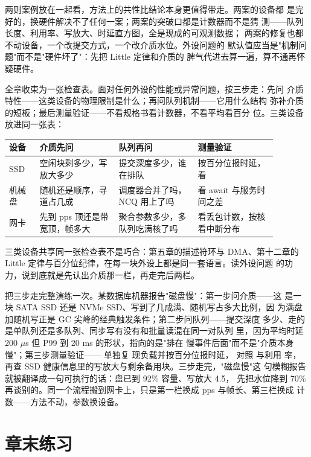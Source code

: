 两则案例放在一起看，方法上的共性比结论本身更值得带走。两案的设备都
是完好的，换硬件解决不了任何一案；两案的突破口都是计数器而不是猜
测——队列长度、利用率、写放大、时延直方图，全是现成的可观测数据；
两案的修复也都不动设备，一个改提交方式，一个改介质水位。外设问题的
默认值应当是"机制问题"而不是"硬件坏了"：先把 Little 定律和介质的
脾气代进去算一遍，算不通再怀疑硬件。

全章收束为一张检查表。面对任何外设的性能或异常问题，按三步走：先问
介质特性——这类设备的物理限制是什么；再问队列机制——它用什么结构
弥补介质的短板；最后测量验证——不看规格书看计数器，不看平均看百分
位。三类设备放进同一张表：

\begin{longtable}{L{0.10\linewidth}L{0.26\linewidth}L{0.26\linewidth}L{0.26\linewidth}}
\toprule
设备 & 介质先问 & 队列再问 & 测量验证 \\
\midrule
SSD & 空闲块剩多少，写放大多少 & 提交深度多少，谁在排队 &  按百分位报时延， 看  \\
机械盘 & 随机还是顺序，寻道占几成 & 调度器合并了吗，NCQ 用上了吗 &  看 await 与服务时间之差 \\
网卡 & 先到 pps 顶还是带宽顶，帧多大 & 聚合参数多少，多队列吃满核了吗 &  看丢包计数，按核看中断分布 \\
\bottomrule
\end{longtable}

三类设备共享同一张检查表不是巧合：第五章的描述符环与 DMA、第十二章的
Little 定律与百分位纪律，在每一块外设上都是同一套语言。读外设问题
的功力，说到底就是先认出介质那一栏，再走完后两栏。

把三步走完整演练一次。某数据库机器报告"磁盘慢"：第一步问介质——这
是一块 SATA SSD 还是 NVMe SSD、写到了几成满、随机写占多大比例，因
为满盘加随机写正是 GC 尖峰的经典触发条件；第二步问队列——提交深度
多少、走的是单队列还是多队列、同步写有没有和批量读混在同一对队列
里，因为平均时延 200 $\mu$s 但 P99 到 20 ms 的形状，指向的是"排在
慢事件后面"而不是"介质本身慢"；第三步测量验证—— 单独复
现负载并按百分位报时延， 对照  与利用
率，再查 SSD 健康信息里的写放大与剩余备用块。三步走完，"磁盘慢"这
句模糊报告就被翻译成一句可执行的话：盘已到 92\% 容量、写放大 4.5，
先把水位降到 70\% 再谈别的。同一个流程搬到网卡上，只是第一栏换成
pps 与帧长、第三栏换成  计数——方法不动，参数换设备。

\section*{章末练习}

